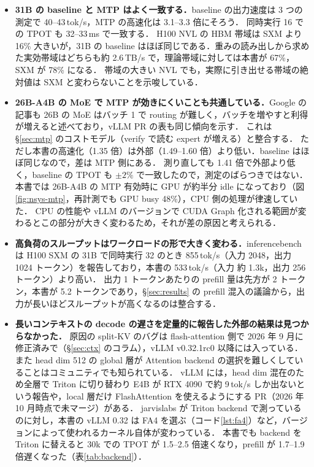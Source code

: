\begin{itemize}
\item \textbf{31B の baseline と MTP はよく一致する．}baseline の出力速度は 3 つの測定で 40--43\,tok/s，MTP の高速化は 3.1--3.3 倍にそろう．
      同時実行 16 での TPOT も 32--33\,ms で一致する．
      H100 NVL の HBM 帯域は SXM より 16\% 大きいが，31B の baseline はほぼ同じである．重みの読み出しから求めた実効帯域はどちらも約 2.6\,TB/s で，理論帯域に対しては本書が 67\%，SXM が 78\% になる．
      帯域の大きい NVL でも，実際に引き出せる帯域の絶対値は SXM と変わらないことを示唆している．
\item \textbf{26B-A4B の MoE で MTP が効きにくいことも共通している．}Google の記事も 26B の MoE はバッチ 1 で routing が難しく，バッチを増やすと利得が増えると述べており\cite{mtpblog}，vLLM PR の表も同じ傾向を示す．
      これは \S\ref{sec:mtp} のコストモデル（verify で読む expert が増える）と整合する．
      ただし本書の高速化（1.35 倍）は外部（1.49--1.60 倍）より低い．baseline はほぼ同じなので，差は MTP 側にある．
      測り直しても 1.41 倍で外部より低く，baseline の TPOT も $\pm 2\%$ で一致したので，測定のばらつきではない．
      本書では 26B-A4B の MTP 有効時に GPU が約半分 idle になっており（図\ref{fig:nsys-mtp}，再計測でも GPU busy 48\%），CPU 側の処理が律速していた．
      CPU の性能や vLLM のバージョンで CUDA Graph 化される範囲が変わるとこの部分が大きく変わるため，それが差の原因と考えられる．
\item \textbf{高負荷のスループットはワークロードの形で大きく変わる．}inferencebench は H100 SXM の 31B で同時実行 32 のとき 855\,tok/s（入力 2048，出力 1024 トークン）を報告しており\cite{inferencebench}，本書の 533\,tok/s（入力 約 1.3k，出力 256 トークン）より高い．
      出力 1 トークンあたりの prefill 量は先方が 2 トークン，本書が 5.2 トークンであり，\S\ref{sec:results} の prefill 混入の議論から，出力が長いほどスループットが高くなるのは整合する．
\item \textbf{長いコンテキストの decode の遅さを定量的に報告した外部の結果は見つからなかった．}
      原因の split-KV のバグは flash-attention 側で 2026 年 9 月に修正済みで（\S\ref{sec:ctx} のコラム），vLLM v0.32.1rc0 以降には入っている．
      また head dim 512 の global 層が Attention backend の選択を難しくしていることはコミュニティでも知られている．
      vLLM には，head dim 混在のため全層で Triton に切り替わり E4B が RTX 4090 で約 9\,tok/s しか出ないという報告\cite{vllmissue38887}や，local 層だけ FlashAttention を使えるようにする PR\cite{vllmpr38891}（2026 年 10 月時点で未マージ）がある．
      jarvislabs が Triton backend で測っているのに対し，本書の vLLM 0.32 は FA4 を選ぶ（コード\ref{lst:fa4}）など，バージョンによって使われるカーネル自体が変わっている．
      本書でも backend を Triton に替えると 30k での TPOT が 1.5--2.5 倍速くなり，prefill が 1.7--1.9 倍遅くなった（表\ref{tab:backend}）．
\end{itemize}

